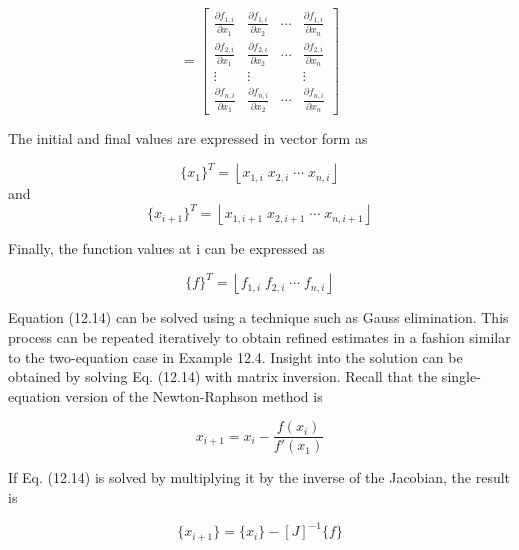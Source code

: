 \documentclass[../main.tex]{subfiles}
\begin{document}
\begin{equation}
[J]=\begin{bmatrix}
\frac{\partial f_{1,i}}{\partial x_{1}} &\frac{\partial f_{1,i}}{\partial x_{2}} & \cdots  & \frac{\partial f_{1,i}}{\partial x_{n}}\\
 \frac{\partial f_{2,i}}{\partial x_{1}}& \frac{\partial f_{2,i}}{\partial x_{2}} & \cdots  &\frac{\partial f_{2,i}}{\partial x_{n}} \\
\vdots  &  \vdots &  & \vdots \\
 \frac{\partial f_{n,i}}{\partial x_{1}}& \frac{\partial f_{n,i}}{\partial x_{2}} & \cdots  & \frac{\partial f_{n,i}}{\partial x_{n}}
\end{bmatrix}
\tag{12.15}
\end{equation}

The initial and final values are expressed in vector form as

\begin{equation}
\{x_{1}\}^{T} = \left \lfloor x_{1,i} \; x_{2,i}  \; \cdots \; x_{n,i} \right \rfloor
\end{equation}
and
\begin{equation}
\{x_{i+1}\}^{T}= \left \lfloor x_{1,i+1} \; x_{2,i+1}  \; \cdots \; x_{n,i+1} \right \rfloor
\end{equation}

Finally, the function values at i can be expressed as

\begin{equation}
\{f\}^{T}= \left \lfloor f_{1,i} \; f_{2,i}  \; \cdots \; f_{n,i}\right \rfloor
\end{equation}

Equation (12.14) can be solved using a technique such as Gauss elimination. This
process can be repeated iteratively to obtain refined estimates in a fashion similar to the
two-equation case in Example 12.4.
Insight into the solution can be obtained by solving Eq. (12.14) with matrix inversion.
Recall that the single-equation version of the Newton-Raphson method is

\begin{equation}
x_{i+1}=x_{i}-\frac{f(x_{i})}{f'(x_{1})}
\tag{12.16}
\end{equation}

If Eq. (12.14) is solved by multiplying it by the inverse of the Jacobian, the result is

\begin{equation}
\{x_{i+1}\}=\{x_{i}\}-[J]^{-1}\{f\}
\tag{12.17}
\end{equation}
\end{document}
